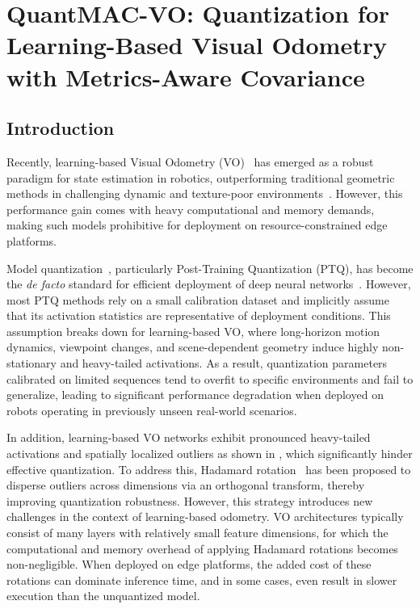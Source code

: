 \chapter{QuantMAC-VO: Quantization for Learning-Based Visual Odometry with Metrics-Aware Covariance} \label{chapter:quantmacvo}

\section{Introduction}
\label{sec:quantmacvo_intro}

Recently, learning-based Visual Odometry (VO)~\cite{wang2017deepvo, li2018undeepvo,wang2021tartanvo,dpvo,qiu2025mac} has emerged as a robust paradigm for state estimation in robotics, outperforming traditional geometric methods in challenging dynamic and texture-poor environments~\cite{mur2015orb,mur2017orb,campos2021orb}. However, this performance gain comes with heavy computational and memory demands, making such models prohibitive for deployment on resource-constrained edge platforms.

Model quantization~\cite{nagel2021white,krishnamoorthi2018quantizing}, particularly Post-Training Quantization (PTQ), has become the \textit{de facto} standard for efficient deployment of deep neural networks~\cite{zhoulidar,ptq4vit,frantar2022gptq,xiao2022smoothquant}. 
However, most PTQ methods rely on a small calibration dataset and implicitly assume that its activation statistics are representative of deployment conditions. 
This assumption breaks down for learning-based VO, where long-horizon motion dynamics, viewpoint changes, and scene-dependent geometry induce highly non-stationary and heavy-tailed activations. 
As a result, quantization parameters calibrated on limited sequences tend to overfit to specific environments and fail to generalize, leading to significant performance degradation when deployed on robots operating in previously unseen real-world scenarios.

In addition, learning-based VO networks exhibit pronounced heavy-tailed activations and spatially localized outliers as shown in , which significantly hinder effective quantization. 
To address this, Hadamard rotation~\cite{ashkboos2024quarot} has been proposed to disperse outliers across dimensions via an orthogonal transform, thereby improving quantization robustness. 
However, this strategy introduces new challenges in the context of learning-based odometry. 
VO architectures typically consist of many layers with relatively small feature dimensions, for which the computational and memory overhead of applying Hadamard rotations becomes non-negligible. 
When deployed on edge platforms, the added cost of these rotations can dominate inference time, and in some cases, even result in slower execution than the unquantized model.

